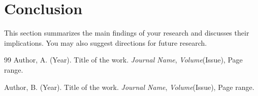 \documentclass[12pt]{article}  %
\begin{document}
\section{Conclusion}
\label{sec:conclusion}
This section summarizes the main findings of your research and discusses their implications. You may also suggest directions for future research.

\begin{thebibliography}{99}
Author, A. (Year). Title of the work. \textit{Journal Name}, \textit{Volume}(Issue), Page range.

Author, B. (Year). Title of the work. \textit{Journal Name}, \textit{Volume}(Issue), Page range.

\end{thebibliography}
\end{document}
